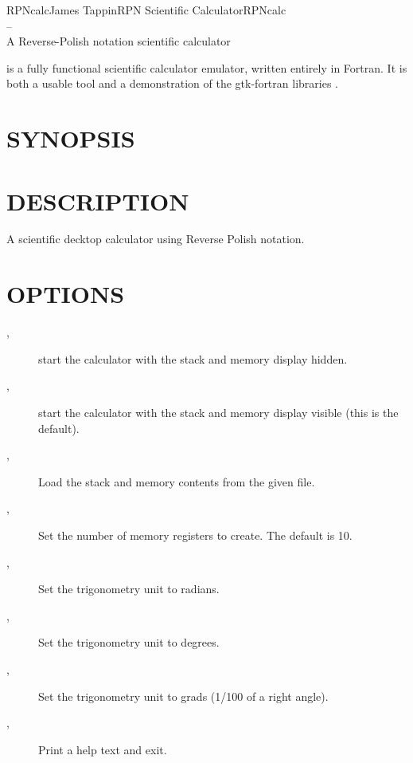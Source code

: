 \documentclass{article}
\begin{document}
\begin{Name}{1}{RPNcalc}{James Tappin}{RPN Scientific Calculator}{RPNcalc\\--\\A Reverse-Polish notation scientific calculator}

    is a fully
  functional scientific calculator emulator, written entirely in
  Fortran. It is both a usable tool and a demonstration of the
  gtk-fortran libraries .
\end{Name}

\section{SYNOPSIS}

    \Dots

  \section{DESCRIPTION}

  A scientific decktop calculator using Reverse Polish notation.

  \section{OPTIONS}

  \begin{description}
  \item [, ] start the
    calculator with the stack and memory display hidden.
  \item [, ] start the calculator
    with the stack and memory display visible (this is the default).
  \item [, ]
    Load the stack and memory contents from the given file.
  \item [, ]
    Set the number of memory registers to create. The default is 10.
  \item [, ] Set the trigonometry unit to
    radians.
  \item [, ] Set the trigonometry unit to
    degrees.
  \item[, ] Set the trigonometry unit to grads
    (1/100 of a right angle).
  \item [, ] Print a help text
    and exit.
  \end{description}
\end{document}
